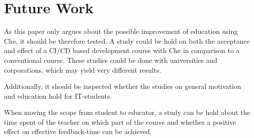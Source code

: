 \documentclass[english,utf8]{lni}
\begin{document}
\section*{Future Work}
\label{sec:FutureWork}
As this paper only argues about the possible improvement of education using Che, it should be therefore tested. 
A study could be hold on both the acceptance and effect of a CI/CD based development course with Che in comparison to a conventional course. 
These studies could be done with universities and corporations, which 
may yield very different results.   

Additionally, it should be inspected whether the studies on general motivation and education hold for IT-students. 

When moving the scope from student to educator, a study can be hold about the time spent of the teacher on which part of the course and whether a positive effect on effective feedback-time can be achieved. 


\end{document}
